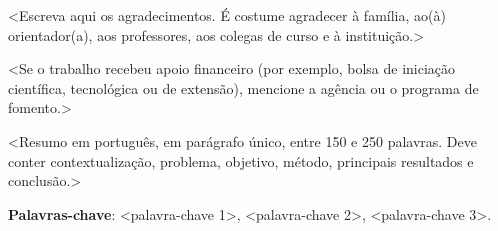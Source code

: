 \documentclass[
	12pt,				%
	openright,			%
	oneside,			%
	a4paper,			%
	english,			%
	brazil,				%
	]{abntex2}
\begin{document}
\begin{agradecimentos}

<Escreva aqui os agradecimentos. É costume agradecer à família, ao(à)
orientador(a), aos professores, aos colegas de curso e à instituição.>

<Se o trabalho recebeu apoio financeiro (por exemplo, bolsa de iniciação
científica, tecnológica ou de extensão), mencione a agência ou o programa
de fomento.>

\end{agradecimentos}


\begin{resumo}

\noindent
<Resumo em português, em parágrafo único, entre 150 e 250 palavras. Deve conter
contextualização, problema, objetivo, método, principais resultados e conclusão.>

\noindent
\textbf{Palavras-chave}: <palavra-chave 1>, <palavra-chave 2>, <palavra-chave 3>.

\end{resumo}

%
%
%

\listoffigures*
\cleardoublepage
\end{document}
